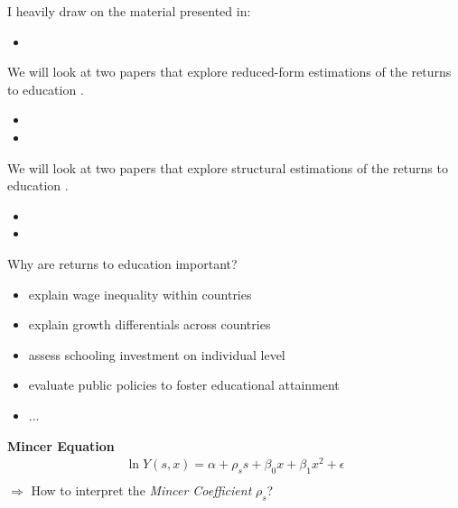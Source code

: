 
 \begin{frame}

 I heavily draw on the material presented in:

\begin{itemize}
\item {}
\end{itemize}

\end{frame}


 \begin{frame}
We will look at two papers that explore reduced-form estimations of the returns to education
.
\begin{itemize}
\item {}
\item {}
\end{itemize}
 \end{frame}

 \begin{frame}
We will look at two papers that explore structural estimations of the returns to education
.
\begin{itemize}
\item {}
\item {}
\end{itemize}
 \end{frame}


\begin{frame}
Why are returns to education important?
\begin{itemize}
\item explain wage inequality within countries
\item explain growth differentials across countries
\item assess schooling investment on individual level
\item evaluate public policies to foster educational attainment
\item ...
\end{itemize}
\end{frame}

\begin{frame}\nocite{Mincer.1958,Mincer.1974}
\textbf{Mincer Equation}\\
\begin{align*}
\ln Y(s, x) = \alpha + \rho_s s + \beta_0 x + \beta_1 x^2 + \epsilon\\
\end{align*}
$\Rightarrow$ How to interpret the \textit{Mincer Coefficient} $\rho_s$?
\end{frame}




